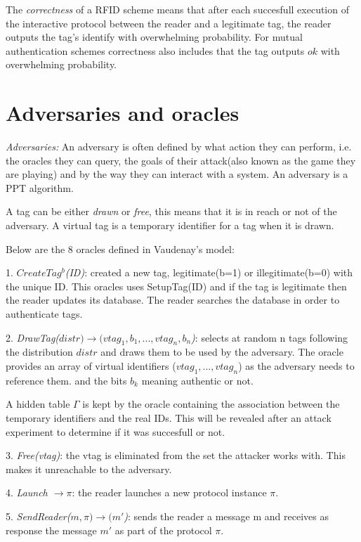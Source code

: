     The \textit{correctness} of a RFID scheme means that after each succesfull execution of the interactive protocol between the reader and a 
    legitimate tag, the reader outputs the tag's identify with overwhelming probability. For mutual authentication schemes correctness also includes
    that the tag outputs $ok$ with overwhelming probability.

\section{Adversaries and oracles}

    \textit{Adversaries:} An adversary is often defined by what action they can perform, i.e. the oracles they can query, 
    the goals of their attack(also known as the game they are playing) and by the way they can interact with a system. An adversary
    is a PPT algorithm.
    
    A tag can be either \textit{drawn} or \textit{free}, this means that it is in reach or not of the 
    adversary. A virtual tag is a temporary identifier for a tag when it is drawn.

    Below are the 8 oracles defined in Vaudenay's model:

    1. \textit{$CreateTag^b$(ID)}: created a new tag, legitimate(b=1) or illegitimate(b=0) with the unique ID.
        This oracles uses SetupTag(ID) and if the tag is legitimate then the reader 
        updates its database. The reader searches the database in order to authenticate tags.
    
    2. \textit{DrawTag($distr) \rightarrow (vtag_1, b_1, ... , vtag_n, b_n$)}: selects at random n tags following the 
    distribution $distr$ and draws them to be used by the adversary. The oracle provides
    an array of virtual identifiers ($vtag_1, ... ,vtag_n$) as the adversary needs to reference them.
    and the bits $b_k$ meaning authentic or not. 
    
    A hidden table $\Gamma$ is kept by the oracle containing the association between the temporary identifiers and the real IDs.
    This will be revealed after an attack experiment to determine if it was succesfull or not.

    3. \textit{Free(vtag)}: the vtag is eliminated from the set the attacker works with. This makes it unreachable to the adversary.
    
    4. \textit{Launch $\rightarrow \pi$}: the reader launches a new protocol instance $\pi$.

    5. \textit{SendReader($m, \pi) \rightarrow (m'$)}: sends the reader a message m and receives as response 
    the message $m'$ as part of the protocol $\pi$.

